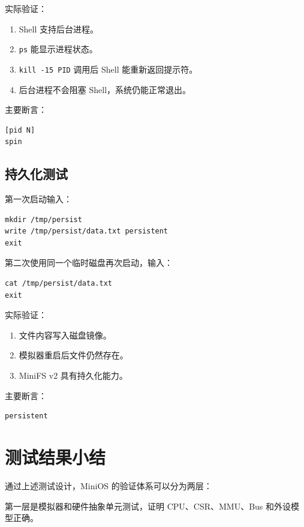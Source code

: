 \documentclass[UTF8,a4paper,12pt,openany,fontset=fandol]{ctexrep}
\begin{document}
实际验证：

\begin{enumerate}
\item Shell 支持后台进程。
\item \nolinkurl{ps} 能显示进程状态。
\item \nolinkurl{kill -15 PID} 调用后 Shell 能重新返回提示符。
\item 后台进程不会阻塞 Shell，系统仍能正常退出。
\end{enumerate}

主要断言：

\begin{lstlisting}
[pid N]
spin
\end{lstlisting}

\subsection{持久化测试}

第一次启动输入：

\begin{lstlisting}
mkdir /tmp/persist
write /tmp/persist/data.txt persistent
exit
\end{lstlisting}

第二次使用同一个临时磁盘再次启动，输入：

\begin{lstlisting}
cat /tmp/persist/data.txt
exit
\end{lstlisting}

实际验证：

\begin{enumerate}
\item 文件内容写入磁盘镜像。
\item 模拟器重启后文件仍然存在。
\item MiniFS v2 具有持久化能力。
\end{enumerate}

主要断言：

\begin{lstlisting}
persistent
\end{lstlisting}

\section{测试结果小结}

通过上述测试设计，MiniOS 的验证体系可以分为两层：

第一层是模拟器和硬件抽象单元测试，证明 CPU、CSR、MMU、Bus 和外设模型正确。
\end{document}
